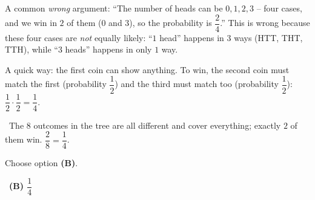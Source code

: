 \documentclass[11pt]{article}
\providecommand{\AnsWord}{Đáp số}
\newcommand{\ans}[1]{\par\smallskip{\bfseries\color{tmGreen!88!black}\AnsWord:}\ {\bfseries\color{AnsRed}#1}\par}
\newcommand{\verify}[1]{\par\smallskip\noindent{\bfseries\color{tmGreen!80!black}\faCheckCircle\ \CheckWord}\ #1\par}
\def\AnsWord{Answer}
\def\CheckWord{Check:}
\begin{document}
{\begin{warnbox}A common \emph{wrong} argument: ``The number of heads can be $0,1,2,3$ -- four cases, and we win in $2$ of them ($0$ and $3$), so the probability is $\dfrac24$.'' This is wrong because these four cases are \emph{not} equally likely: ``$1$ head'' happens in $3$ ways (HTT, THT, TTH), while ``$3$ heads'' happens in only $1$ way.\end{warnbox}

\begin{tipbox}A quick way: the first coin can show anything. To win, the second coin must match the first (probability $\dfrac12$) and the third must match too (probability $\dfrac12$): $\dfrac12\cdot\dfrac12=\dfrac14$.\end{tipbox}

\verify{The $8$ outcomes in the tree are all different and cover everything; exactly $2$ of them win. $\dfrac28=\dfrac14$.}
Choose option \textbf{(B)}.
\ans{(B) $\dfrac14$}
}
\end{document}

